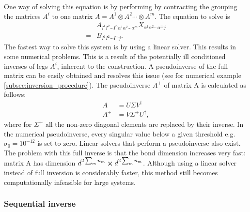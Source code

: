 One way of solving this equation is by performing by contracting the grouping the matrices $A^i$ to one matrix $A = A^1 \otimes A^2 \cdots \otimes A^m$. The equation to solve is
\begin{equation}
  \begin{split}
    &A_{ I^1  I^2 \cdots I^n \alpha^1 \alpha^2 \cdots \alpha^m   } X_{ \alpha^1 \alpha^2 \cdots \alpha^m j  } \\
    = &B_{  I^1  I^2 \cdots I^m   j } .
  \end{split}
\end{equation}
The fastest way to solve this system is by using a linear solver. This results in some numerical problems. This is a result of the potentially ill conditioned inverses of legs $A^i$, inherent to the construction. A pseudoinverse of the full matrix can be easily obtained and resolves this issue (see for numerical example \cref{subsec:inversion_procedure}). The pseudoinverse $A^{+}$ of matrix A is calculated as follows:
\begin{align}
  A     & = U \Sigma V^{\dagger}      \\
  A^{+} & = V \Sigma^{+} U^{\dagger},
\end{align}
where for $\Sigma^{+}$ all the non-zero diagonal elements are replaced by their inverse. In the numerical pseudoinverse, every singular value below a given threshold e.g.\ $\sigma_0 = 10^{-12}$ is set to zero. Linear solvers that perform a pseudoinverse also exist. The problem with this full inverse is that the bond dimension increases very fast: matrix A has dimension $d^ {2 \sum_m n_m } \cross d^ {2 \sum_m n_m } $. Although using a linear solver instead of full inversion is considerably faster, this method still becomes computationally infeasible for large systems.

\subsubsection{Sequential inverse}

